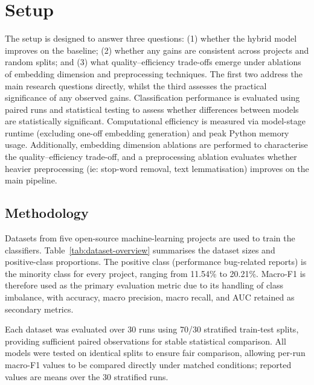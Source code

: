 \documentclass[10pt,a4paper]{article}
\begin{document}
\section{Setup}

The setup is designed to answer three questions: (1) whether the hybrid model improves on the baseline; (2) whether any gains are consistent across projects and random splits; and (3) what quality--efficiency trade-offs emerge under ablations of embedding dimension and preprocessing techniques. The first two address the main research questions directly, whilst the third assesses the practical significance of any observed gains. Classification performance is evaluated using paired runs and statistical testing to assess whether differences between models are statistically significant. Computational efficiency is measured via model-stage runtime (excluding one-off embedding generation) and peak Python memory usage. Additionally, embedding dimension ablations are performed to characterise the quality--efficiency trade-off, and a preprocessing ablation evaluates whether heavier preprocessing (ie: stop-word removal, text lemmatisation) improves on the main pipeline.


\subsection{Methodology}\label{methodology}

Datasets from five open-source machine-learning projects are used to train the classifiers. Table~\ref{tab:dataset-overview} summarises the dataset sizes and positive-class proportions. The positive class (performance bug-related reports) is the minority class for every project, ranging from 11.54\% to 20.21\%. Macro-F1 is therefore used as the primary evaluation metric due to its handling of class imbalance, with accuracy, macro precision, macro recall, and AUC retained as secondary metrics.

\begin{table}[h]
\centering
\small
\setlength{\tabcolsep}{6pt}

\caption{Dataset sizes and positive-class proportions.}\label{tab:dataset-overview}
\end{table}

Each dataset was evaluated over 30 runs using 70/30 stratified train-test splits, providing sufficient paired observations for stable statistical comparison. All models were tested on identical splits to ensure fair comparison, allowing per-run macro-F1 values to be compared directly under matched conditions; reported values are means over the 30 stratified runs.
\end{document}
